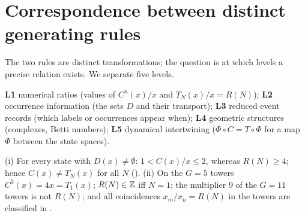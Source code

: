 \section{Correspondence between distinct generating rules}\label{sec:correspondence}
The two rules are distinct transformations; the question is at which levels a precise relation exists. We separate five levels.
\begin{definition}
\textbf{L1} numerical ratios (values of $C^n(x)/x$ and $T_N(x)/x=R(N)$); \textbf{L2} occurrence information (the sets $D$ and their transport); \textbf{L3} reduced event records (which labels or occurrences appear when); \textbf{L4} geometric structures (complexes, Betti numbers); \textbf{L5} dynamical intertwining ($\Phi\circ C=T\circ\Phi$ for a map $\Phi$ between the state spaces).
\end{definition}
\begin{theorem}\label{thm:cited-corr}
(i) For every state with $D(x)\ne\emptyset$: $1<C(x)/x\le2$, whereas $R(N)\ge4$; hence $C(x)\ne T_N(x)$ for all $N$ (). (ii) On the $G=5$ towers $C^3(x)=4x=T_1(x)$; $R(N)\in\mathbb Z$ iff $N=1$; the multiplier $9$ of the $G=11$ towers is not $R(N)$; and all coincidences $x_m/x_n=R(N)$ in the towers are classified in .
\end{theorem}

